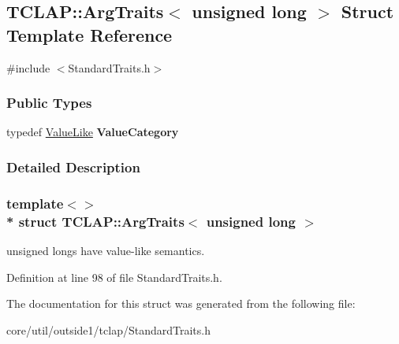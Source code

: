 \hypertarget{structTCLAP_1_1ArgTraits_3_01unsigned_01long_01_4}{}\subsection{T\+C\+L\+AP\+:\+:Arg\+Traits$<$ unsigned long $>$ Struct Template Reference}
\label{structTCLAP_1_1ArgTraits_3_01unsigned_01long_01_4}


{\ttfamily \#include $<$Standard\+Traits.\+h$>$}

\subsubsection*{Public Types}
\begin{DoxyCompactItemize}
\item 
typedef \hyperlink{structTCLAP_1_1ValueLike}{Value\+Like} {\bfseries Value\+Category}\hypertarget{structTCLAP_1_1ArgTraits_3_01unsigned_01long_01_4_aa6aeb6243e6fbf8b5aba659083baa1ac}{}\label{structTCLAP_1_1ArgTraits_3_01unsigned_01long_01_4_aa6aeb6243e6fbf8b5aba659083baa1ac}

\end{DoxyCompactItemize}


\subsubsection{Detailed Description}
\subsubsection*{template$<$$>$\\*
struct T\+C\+L\+A\+P\+::\+Arg\+Traits$<$ unsigned long $>$}

unsigned longs have value-\/like semantics. 

Definition at line 98 of file Standard\+Traits.\+h.



The documentation for this struct was generated from the following file\+:\begin{DoxyCompactItemize}
\item 
core/util/outside1/tclap/Standard\+Traits.\+h\end{DoxyCompactItemize}
